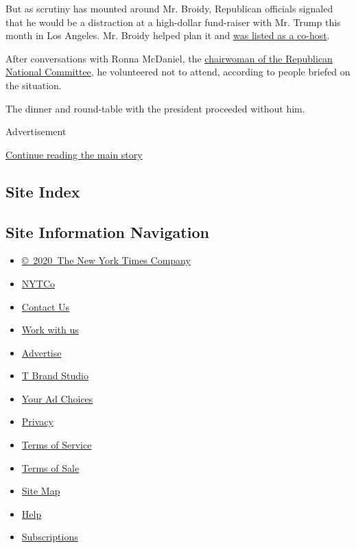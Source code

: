 But as scrutiny has mounted around Mr. Broidy, Republican officials
signaled that he would be a distraction at a high-dollar fund-raiser
with Mr. Trump this month in Los Angeles. Mr. Broidy helped plan it and
\href{https://twitter.com/kenvogel/status/973623387951124487}{was listed
as a co-host}.

After conversations with Ronna McDaniel, the
\href{https://www.nytimes.com/2018/01/13/us/politics/ronna-romney-mcdaniel.html}{chairwoman
of the Republican National Committee}, he volunteered not to attend,
according to people briefed on the situation.

The dinner and round-table with the president proceeded without him.

Advertisement

\protect\hyperlink{after-bottom}{Continue reading the main story}

\hypertarget{site-index}{%
\subsection{Site Index}\label{site-index}}

\hypertarget{site-information-navigation}{%
\subsection{Site Information
Navigation}\label{site-information-navigation}}

\begin{itemize}
\tightlist
\item
  \href{https://help.nytimes.com/hc/en-us/articles/115014792127-Copyright-notice}{©~2020~The
  New York Times Company}
\end{itemize}

\begin{itemize}
\tightlist
\item
  \href{https://www.nytco.com/}{NYTCo}
\item
  \href{https://help.nytimes.com/hc/en-us/articles/115015385887-Contact-Us}{Contact
  Us}
\item
  \href{https://www.nytco.com/careers/}{Work with us}
\item
  \href{https://nytmediakit.com/}{Advertise}
\item
  \href{http://www.tbrandstudio.com/}{T Brand Studio}
\item
  \href{https://www.nytimes.com/privacy/cookie-policy\#how-do-i-manage-trackers}{Your
  Ad Choices}
\item
  \href{https://www.nytimes.com/privacy}{Privacy}
\item
  \href{https://help.nytimes.com/hc/en-us/articles/115014893428-Terms-of-service}{Terms
  of Service}
\item
  \href{https://help.nytimes.com/hc/en-us/articles/115014893968-Terms-of-sale}{Terms
  of Sale}
\item
  \href{https://spiderbites.nytimes.com}{Site Map}
\item
  \href{https://help.nytimes.com/hc/en-us}{Help}
\item
  \href{https://www.nytimes.com/subscription?campaignId=37WXW}{Subscriptions}
\end{itemize}

